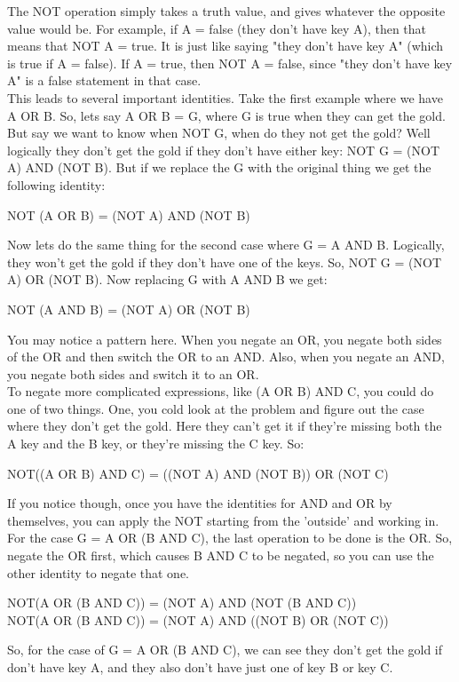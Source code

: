 The NOT operation simply takes a truth value, and gives whatever the opposite value would be. For example, if A = false (they don't have key A), then that means that NOT A = true. It is just like saying "they don't have key A" (which is true if A = false). If A = true, then NOT A = false, since "they don't have key A" is a false statement in that case.\\

This leads to several important identities. Take the first example where we have A OR B. So, lets say A OR B = G, where G is true when they can get the gold. But say we want to know when NOT G, when do they not get the gold? Well logically they don't get the gold if they don't have either key: NOT G = (NOT A) AND (NOT B). But if we replace the G with the original thing we get the following identity:

\begin{center}
	NOT (A OR B) = (NOT A) AND (NOT B)
\end{center}

Now lets do the same thing for the second case where G = A AND B. Logically, they won't get the gold if they don't have one of the keys. So, NOT G = (NOT A) OR (NOT B). Now replacing G with A AND B we get:

\begin{center}
	NOT (A AND B) = (NOT A) OR (NOT B)
\end{center}

You may notice a pattern here. When you negate an OR, you negate both sides of the OR and then switch the OR to an AND. Also, when you negate an AND, you negate both sides and switch it to an OR.\\

To negate more complicated expressions, like (A OR B) AND C, you could do one of two things. One, you cold look at the problem and figure out the case where they don't get the gold. Here they can't get it if they're missing both the A key and the B key, or they're missing the C key. So:

\begin{center}
	NOT((A OR B) AND C) = ((NOT A) AND (NOT B)) OR (NOT C)
\end{center}

If you notice though, once you have the identities for AND and OR by themselves, you can apply the NOT starting from the 'outside' and working in. For the case G = A OR (B AND C), the last operation to be done is the OR. So, negate the OR first, which causes B AND C to be negated, so you can use the other identity to negate that one.

\begin{center}
	NOT(A OR (B AND C)) = (NOT A) AND (NOT (B AND C))\\
	
	NOT(A OR (B AND C)) = (NOT A) AND ((NOT B) OR (NOT C))
\end{center}

So, for the case of G = A OR (B AND C), we can see they don't get the gold if don't have key A, and they also don't have just one of key B or key C.\\